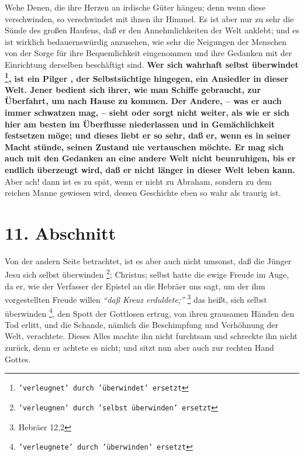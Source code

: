 Wehe Denen, die ihre Herzen an irdische Güter hängen; denn
wenn diese
verschwinden, so verschwindet mit ihnen ihr Himmel.  Es ist
aber nur zu sehr die
Sünde des großen Haufens, daß er den Annehmlichkeiten der Welt anklebt; und es
ist wirklich bedauernswürdig anzusehen, wie sehr die Neigungen der Menschen von
der Sorge für ihre Bequemlichkeit eingenommen und ihre Gedanken mit der
Einrichtung derselben beschäftigt sind. \textbf{Wer sich wahrhaft selbst
überwindet \footnote{\texttt{'verleugnet' durch 'überwindet' ersetzt}}, ist
ein Pilger , der Selbstsüchtige hingegen, ein Ansiedler in dieser
Welt. Jener
bedient sich ihrer, wie man Schiffe gebraucht, zur Überfahrt, um nach Hause zu
kommen. Der Andere, -- was er auch immer schwatzen mag, -- sieht oder sorgt
nicht weiter, als wie er sich hier am besten im Überflusse niederlassen und in
Gemächlichkeit festsetzen möge; und dieses liebt er so sehr, daß er, wenn es in
seiner Macht stünde, seinen Zustand nie vertauschen möchte. Er mag sich auch mit
den Gedanken an eine andere Welt nicht beunruhigen, bis er endlich überzeugt
wird, daß er nicht länger in dieser Welt leben kann.} Aber ach! dann ist es zu
spät, wenn er nicht zu Abraham, sondern zu dem reichen Manne gewiesen wird,
dessen Geschichte eben so wahr als traurig ist.

\section{11. Abschnitt} \label{kap4_ab11}

Von der andern Seite betrachtet, ist es aber auch nicht umsonst, daß die Jünger
Jesu sich selbst überwinden \footnote{\texttt{'verleugnen' durch 'selbst überwinden'
ersetzt}}; Christus; selbst hatte die ewige Freude im Auge, da er,
wie der Verfasser der Epistel an die Hebräer uns sagt, um der ihm vorgestellten
Freude willen
\textit{"`daß Kreuz erduldete;"'}
\footnote{Hebräer 12,2}
das heißt, sich
selbst überwinden \footnote{\texttt{'verleugnete' durch 'überwinden' ersetzt}}, den
Spott der Gottlosen ertrug, von ihren grausamen Händen
den Tod erlitt, und die Schande, nämlich die Beschimpfung und Verhöhnung der
Welt, verachtete. Dieses Alles machte ihn nicht furchtsam und schreckte ihn
nicht zurück, denn er achtete es nicht; und sitzt nun aber auch zur rechten Hand
Gottes.

\medskip

